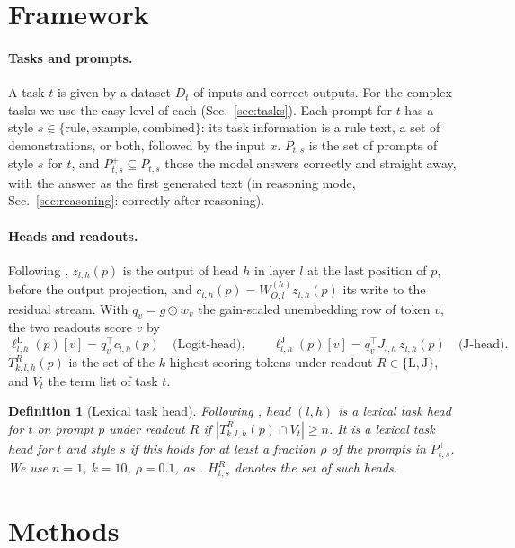 \documentclass[11pt,a4paper]{article}
\newtheorem{definition}{Definition}
\begin{document}
\section{Framework}\label{sec:framework}
\paragraph{Tasks and prompts.} A task $t$ is given by a dataset $D_t$ of inputs and correct outputs. For the complex tasks we use the easy level of each (Sec.~\ref{sec:tasks}). Each prompt for $t$ has a style $s\in\{\text{rule},\text{example},\text{combined}\}$: its task information is a rule text, a set of demonstrations, or both, followed by the input $x$. $P_{t,s}$ is the set of prompts of style $s$ for $t$, and $P^{+}_{t,s}\subseteq P_{t,s}$ those the model answers correctly and straight away, with the answer as the first generated text (in reasoning mode, Sec.~\ref{sec:reasoning}: correctly after reasoning).

\paragraph{Heads and readouts.} Following \citet[Sec.~2]{merlo2026headjlens}, $z_{l,h}(p)$ is the output of head $h$ in layer $l$ at the last position of $p$, before the output projection, and $c_{l,h}(p)=W^{(h)}_{O,l}z_{l,h}(p)$ its write to the residual stream. With $q_v=g\odot w_v$ the gain-scaled unembedding row of token $v$, the two readouts score $v$ by
\[
\ell^{\mathrm{L}}_{l,h}(p)[v]=q_v^\top c_{l,h}(p)\quad\text{(Logit-head)},\qquad
\ell^{\mathrm{J}}_{l,h}(p)[v]=q_v^\top J_{l,h}\,z_{l,h}(p)\quad\text{(J-head)}.
\]
$T^{R}_{k,l,h}(p)$ is the set of the $k$ highest-scoring tokens under readout $R\in\{\mathrm{L},\mathrm{J}\}$, and $V_t$ the term list of task $t$.

\begin{definition}[Lexical task head]\label{def:lth}
Following \citet[Sec.~2.2.2]{yang2026shared}, head $(l,h)$ is a lexical task head for $t$ on prompt $p$ under readout $R$ if $|T^{R}_{k,l,h}(p)\cap V_t|\geq n$. It is a lexical task head for $t$ and style $s$ if this holds for at least a fraction $\rho$ of the prompts in $P^{+}_{t,s}$. We use $n=1$, $k=10$, $\rho=0.1$, as \citet{yang2026shared}. $H^{R}_{t,s}$ denotes the set of such heads.
\end{definition}

\section{Methods}\label{sec:methods}
\end{document}
